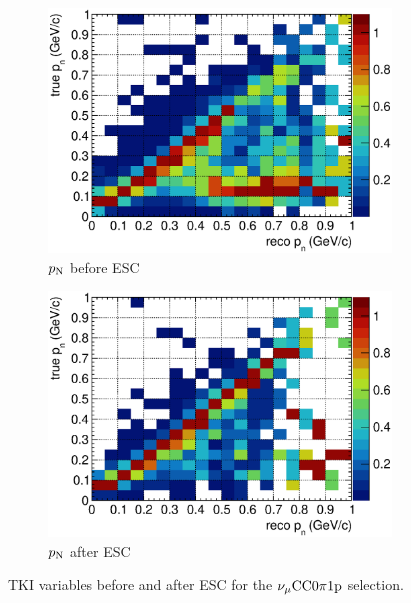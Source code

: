 \begin{figure}
\begin{subfigure}[b]{\dbfigwid\textwidth}
          \end{subfigure}
          \\
          \begin{subfigure}[b]{\dbfigwid\textwidth}
               \centering
               \includegraphics[width=\textwidth]{figures/perf/tki/pn_colnor_resmat_al13.eps}
               \caption{$p_\textrm{N}$ before ESC}
               \label{subfig:esc-pn-bfesc}
          \end{subfigure}
          \begin{subfigure}[b]{\dbfigwid\textwidth}
               \centering
               \includegraphics[width=\textwidth]{figures/perf/tki/pn_colnor_resmat_al14.eps}
               \caption{$p_\textrm{N}$ after ESC}
               \label{subfig:esc-pn-afesc}
          \end{subfigure}
          \caption{TKI variables before and after ESC for the $\nu_{\mu}\textrm{CC}0\pi1\textrm{p}$ selection.}
          \label{fig:mc-tki-0pi-esc}
     \end{figure}

